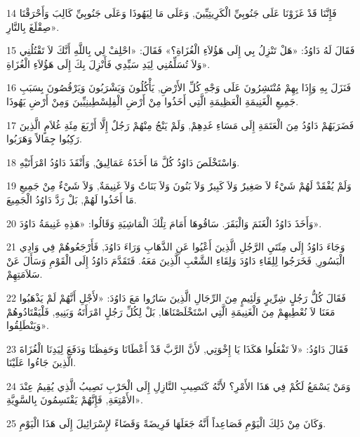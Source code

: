\par 14 فَإِنَّنَا قَدْ غَزَوْنَا عَلَى جَنُوبِيِّ الْكَرِيتِيِّينَ, وَعَلَى مَا لِيَهُوذَا وَعَلَى جَنُوبِيِّ كَالِبَ وَأَحْرَقْنَا صِقْلَغَ بِالنَّارِ».
\par 15 فَقَالَ لَهُ دَاوُدُ: «هَلْ تَنْزِلُ بِي إِلَى هَؤُلاَءِ الْغُزَاةِ؟» فَقَالَ: «احْلِفْ لِي بِاللَّهِ أَنَّكَ لاَ تَقْتُلُنِي وَلاَ تُسَلِّمُنِي لِيَدِ سَيِّدِي فَأَنْزِلَ بِكَ إِلَى هَؤُلاَءِ الْغُزَاةِ».
\par 16 فَنَزَلَ بِهِ وَإِذَا بِهِمْ مُنْتَشِرُونَ عَلَى وَجْهِ كُلِّ الأَرْضِ, يَأْكُلُونَ وَيَشْرَبُونَ وَيَرْقُصُونَ بِسَبَبِ جَمِيعِ الْغَنِيمَةِ الْعَظِيمَةِ الَّتِي أَخَذُوا مِنْ أَرْضِ الْفِلِسْطِينِيِّينَ وَمِنْ أَرْضِ يَهُوذَا.
\par 17 فَضَرَبَهُمْ دَاوُدُ مِنَ الْعَتَمَةِ إِلَى مَسَاءِ غَدِهِمْ, وَلَمْ يَنْجُ مِنْهُمْ رَجُلٌ إِلَّا أَرْبَعَ مِئَةِ غُلاَمٍ الَّذِينَ رَكِبُوا جِمَالاً وَهَرَبُوا.
\par 18 وَاسْتَخْلَصَ دَاوُدُ كُلَّ مَا أَخَذَهُ عَمَالِيقُ, وَأَنْقَذَ دَاوُدُ امْرَأَتَيْهِ.
\par 19 وَلَمْ يُفْقَدْ لَهُمْ شَيْءٌ لاَ صَغِيرٌ وَلاَ كَبِيرٌ وَلاَ بَنُونَ وَلاَ بَنَاتٌ وَلاَ غَنِيمَةٌ, وَلاَ شَيْءٌ مِنْ جَمِيعِ مَا أَخَذُوا لَهُمْ, بَلْ رَدَّ دَاوُدُ الْجَمِيعَ.
\par 20 وَأَخَذَ دَاوُدُ الْغَنَمَ وَالْبَقَرَ. سَاقُوهَا أَمَامَ تِلْكَ الْمَاشِيَةِ وَقَالُوا: «هَذِهِ غَنِيمَةُ دَاوُدَ».
\par 21 وَجَاءَ دَاوُدُ إِلَى مِئَتَيِ الرَّجُلِ الَّذِينَ أَعْيُوا عَنِ الذَّهَابِ وَرَاءَ دَاوُدَ, فَأَرْجَعُوهُمْ فِي وَادِي الْبَسُورِ, فَخَرَجُوا لِلِقَاءِ دَاوُدَ وَلِقَاءِ الشَّعْبِ الَّذِينَ مَعَهُ. فَتَقَدَّمَ دَاوُدُ إِلَى الْقَوْمِ وَسَأَلَ عَنْ سَلاَمَتِهِمْ.
\par 22 فَقَالَ كُلُّ رَجُلٍ شِرِّيرٍ وَلَئِيمٍ مِنَ الرِّجَالِ الَّذِينَ سَارُوا مَعَ دَاوُدَ: «لأَجْلِ أَنَّهُمْ لَمْ يَذْهَبُوا مَعَنَا لاَ نُعْطِيهِمْ مِنَ الْغَنِيمَةِ الَّتِي اسْتَخْلَصْنَاهَا, بَلْ لِكُلِّ رَجُلٍ امْرَأَتَهُ وَبَنِيهِ, فَلْيَقْتَادُوهُمْ وَيَنْطَلِقُوا».
\par 23 فَقَالَ دَاوُدُ: «لاَ تَفْعَلُوا هَكَذَا يَا إِخْوَتِي, لأَنَّ الرَّبَّ قَدْ أَعْطَانَا وَحَفِظَنَا وَدَفَعَ لِيَدِنَا الْغُزَاةَ الَّذِينَ جَاءُوا عَلَيْنَا.
\par 24 وَمَنْ يَسْمَعُ لَكُمْ فِي هَذَا الأَمْرِ؟ لأَنَّهُ كَنَصِيبِ النَّازِلِ إِلَى الْحَرْبِ نَصِيبُ الَّذِي يُقِيمُ عِنْدَ الأَمْتِعَةِ, فَإِنَّهُمْ يَقْتَسِمُونَ بِالسَّوِيَّةِ».
\par 25 وَكَانَ مِنْ ذَلِكَ الْيَوْمِ فَصَاعِداً أَنَّهُ جَعَلَهَا فَرِيضَةً وَقَضَاءً لإِسْرَائِيلَ إِلَى هَذَا الْيَوْمِ.
